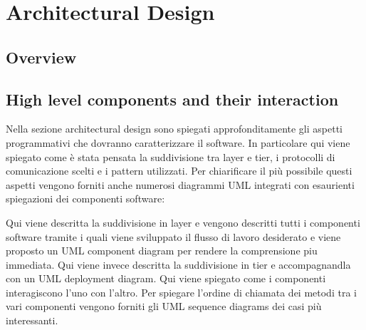\section{Architectural Design}

\subsection{Overview}

\subsection{High level components and their interaction}
Nella sezione architectural design sono spiegati approfonditamente gli aspetti programmativi che dovranno caratterizzare il software. 
In particolare qui viene spiegato come è stata pensata la suddivisione tra layer e tier, i protocolli di comunicazione scelti e i pattern utilizzati. 
Per chiarificare il più possibile questi aspetti vengono forniti anche numerosi diagrammi UML integrati con esaurienti spiegazioni dei componenti software: 
\begin{itemize}
	 Qui viene descritta la suddivisione in layer e vengono descritti tutti i componenti software tramite i quali viene sviluppato il flusso di lavoro desiderato e viene proposto un UML component diagram per rendere la comprensione piu immediata.
	 Qui viene invece descritta la suddivisione in tier e accompagnandla con un UML deployment diagram.
	 Qui viene spiegato come i componenti interagiscono l'uno con l'altro. Per spiegare l'ordine di chiamata dei metodi tra i vari componenti vengono forniti gli UML sequence diagrams dei casi più interessanti.
\end{itemize}
